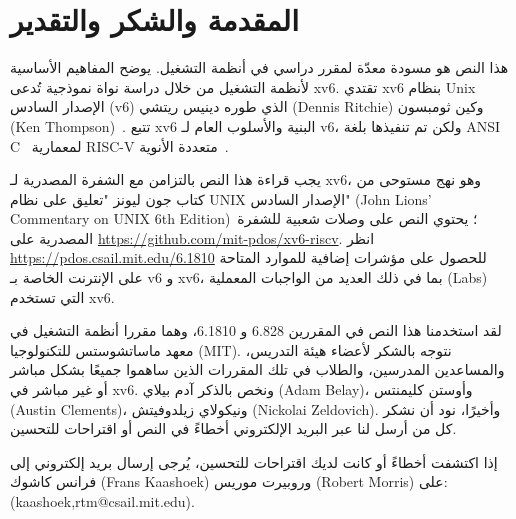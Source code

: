\chapter*{المقدمة والشكر والتقدير}

هذا النص هو مسودة معدّة لمقرر دراسي في أنظمة التشغيل. يوضح المفاهيم الأساسية لأنظمة التشغيل من خلال دراسة نواة نموذجية تُدعى xv6. تقتدي xv6 بنظام Unix الإصدار السادس (v6) الذي طوره دينيس ريتشي (Dennis Ritchie) وكين ثومبسون (Ken Thompson)~\cite{unix}. تتبع xv6 البنية والأسلوب العام لـ v6، ولكن تم تنفيذها بلغة ANSI C~\cite{kernighan} لمعمارية RISC-V متعددة الأنوية~\cite{riscv}.

يجب قراءة هذا النص بالتزامن مع الشفرة المصدرية لـ xv6، وهو نهج مستوحى من كتاب جون ليونز "تعليق على نظام UNIX الإصدار السادس" (John Lions' Commentary on UNIX 6th Edition)~\cite{lions}؛ يحتوي النص على وصلات شعبية للشفرة المصدرية على \url{https://github.com/mit-pdos/xv6-riscv}. انظر \url{https://pdos.csail.mit.edu/6.1810} للحصول على مؤشرات إضافية للموارد المتاحة على الإنترنت الخاصة بـ v6 و xv6، بما في ذلك العديد من الواجبات المعملية (Labs) التي تستخدم xv6.

لقد استخدمنا هذا النص في المقررين 6.828 و 6.1810، وهما مقررا أنظمة التشغيل في معهد ماساتشوستس للتكنولوجيا (MIT). نتوجه بالشكر لأعضاء هيئة التدريس، والمساعدين المدرسين، والطلاب في تلك المقررات الذين ساهموا جميعًا بشكل مباشر أو غير مباشر في xv6. ونخص بالذكر آدم بيلاي (Adam Belay)، وأوستن كليمنتس (Austin Clements)، ونيكولاي زيلدوفيتش (Nickolai Zeldovich). وأخيرًا، نود أن نشكر كل من أرسل لنا عبر البريد الإلكتروني أخطاءً في النص أو اقتراحات للتحسين.

إذا اكتشفت أخطاءً أو كانت لديك اقتراحات للتحسين، يُرجى إرسال بريد إلكتروني إلى فرانس كاشوك (Frans Kaashoek) وروبيرت موريس (Robert Morris) على: (kaashoek,rtm@csail.mit.edu).
